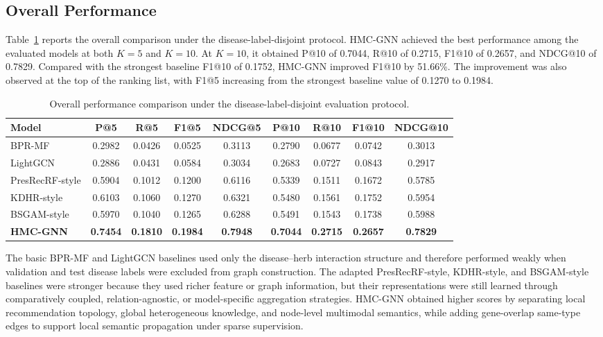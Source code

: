\documentclass[journal,twoside,web]{ieeecolor}
\begin{document}
\subsection{Overall Performance}
\label{subsec:overall_performance}

Table~\ref{tab:overall_comparison} reports the overall comparison under the disease-label-disjoint protocol. HMC-GNN achieved the best performance among the evaluated models at both $K=5$ and $K=10$. At $K=10$, it obtained P@10 of 0.7044, R@10 of 0.2715, F1@10 of 0.2657, and NDCG@10 of 0.7829. Compared with the strongest baseline F1@10 of 0.1752, HMC-GNN improved F1@10 by 51.66\%. The improvement was also observed at the top of the ranking list, with F1@5 increasing from the strongest baseline value of 0.1270 to 0.1984.

\begin{table}[!t]
\centering
\caption{Overall performance comparison under the disease-label-disjoint evaluation protocol.}
\label{tab:overall_comparison}
\footnotesize
\begin{tabular}{lcccccccc}
\toprule
Model & P@5 & R@5 & F1@5 & NDCG@5 & P@10 & R@10 & F1@10 & NDCG@10 \\
\midrule
BPR-MF & 0.2982 & 0.0426 & 0.0525 & 0.3113 & 0.2790 & 0.0677 & 0.0742 & 0.3013 \\
LightGCN & 0.2886 & 0.0431 & 0.0584 & 0.3034 & 0.2683 & 0.0727 & 0.0843 & 0.2917 \\
PresRecRF-style & 0.5904 & 0.1012 & 0.1200 & 0.6116 & 0.5339 & 0.1511 & 0.1672 & 0.5785 \\
KDHR-style & 0.6103 & 0.1060 & 0.1270 & 0.6321 & 0.5480 & 0.1561 & 0.1752 & 0.5954 \\
BSGAM-style & 0.5970 & 0.1040 & 0.1265 & 0.6288 & 0.5491 & 0.1543 & 0.1738 & 0.5988 \\
\textbf{HMC-GNN} & \textbf{0.7454} & \textbf{0.1810} & \textbf{0.1984} & \textbf{0.7948} & \textbf{0.7044} & \textbf{0.2715} & \textbf{0.2657} & \textbf{0.7829} \\
\bottomrule
\end{tabular}
\end{table}

The basic BPR-MF and LightGCN baselines used only the disease--herb interaction structure and therefore performed weakly when validation and test disease labels were excluded from graph construction. The adapted PresRecRF-style, KDHR-style, and BSGAM-style baselines were stronger because they used richer feature or graph information, but their representations were still learned through comparatively coupled, relation-agnostic, or model-specific aggregation strategies. HMC-GNN obtained higher scores by separating local recommendation topology, global heterogeneous knowledge, and node-level multimodal semantics, while adding gene-overlap same-type edges to support local semantic propagation under sparse supervision.
\end{document}
